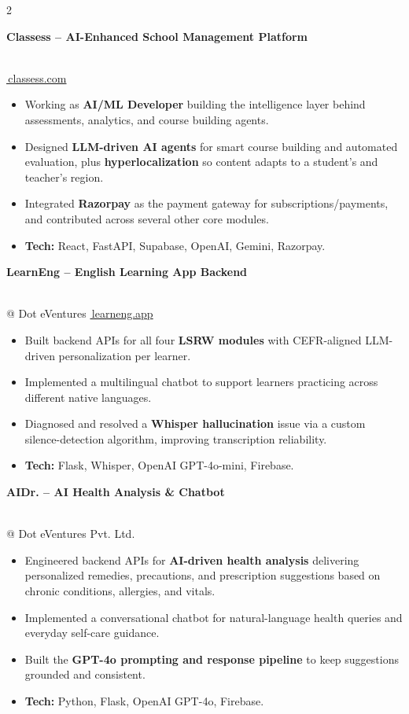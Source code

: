 \documentclass[10pt, a4paper]{article}
\newcommand{\pentry}[3]{%
  \noindent
  \begin{minipage}[t]{0.70\linewidth}
    {\small\textbf{\color{accent}#1}}
  \end{minipage}\hfill%
  \begin{minipage}[t]{0.28\linewidth}
    \raggedleft{\footnotesize\color{mutedtext}#2}
  \end{minipage}\\[1pt]%
  {\footnotesize\color{mutedtext}#3}%
  \vspace{1pt}%
}
\begin{document}
\begin{paracol}{2}
\vspace{2pt}
\pentry{Classess -- AI-Enhanced School Management Platform}{2026 -- Present}{\href{https://classess.com}{\faLink\,classess.com}}
\begin{itemize}
  \item Working as \textbf{AI/ML Developer} building the intelligence layer behind assessments, analytics, and course building agents.
  \item Designed \textbf{LLM-driven AI agents} for smart course building and automated evaluation, plus \textbf{hyperlocalization} so content adapts to a student's and teacher's region.
  \item Integrated \textbf{Razorpay} as the payment gateway for subscriptions/payments, and contributed across several other core modules.
  \item \textbf{Tech:} React, FastAPI, Supabase, OpenAI, Gemini, Razorpay.
\end{itemize}

\vspace{2pt}
\pentry{LearnEng -- English Learning App Backend}{May -- Jun 2025}{@ Dot eVentures \quad \href{https://learneng.app}{\faLink\,learneng.app}}
\begin{itemize}
  \item Built backend APIs for all four \textbf{LSRW modules} with CEFR-aligned LLM-driven personalization per learner.
  \item Implemented a multilingual chatbot to support learners practicing across different native languages.
  \item Diagnosed and resolved a \textbf{Whisper hallucination} issue via a custom silence-detection algorithm, improving transcription reliability.
  \item \textbf{Tech:} Flask, Whisper, OpenAI GPT-4o-mini, Firebase.
\end{itemize}

\vspace{2pt}
\pentry{AIDr. -- AI Health Analysis \& Chatbot}{Feb -- Apr 2025}{@ Dot eVentures Pvt. Ltd.}
\begin{itemize}
  \item Engineered backend APIs for \textbf{AI-driven health analysis} delivering personalized remedies, precautions, and prescription suggestions based on chronic conditions, allergies, and vitals.
  \item Implemented a conversational chatbot for natural-language health queries and everyday self-care guidance.
  \item Built the \textbf{GPT-4o prompting and response pipeline} to keep suggestions grounded and consistent.
  \item \textbf{Tech:} Python, Flask, OpenAI GPT-4o, Firebase.
\end{itemize}


\end{paracol}
\end{document}
